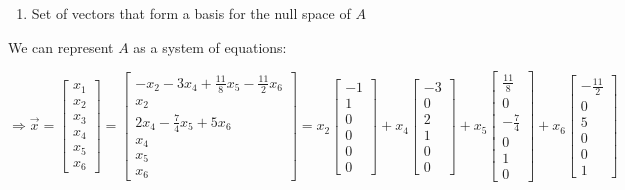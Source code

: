 \documentclass[
  letterpaper,
  DIV=11,
  numbers=noendperiod]{scrartcl}
\providecommand{\tightlist}{%
  \setlength{\itemsep}{0pt}\setlength{\parskip}{0pt}}\usepackage{longtable,booktabs,array}
\begin{document}
\begin{enumerate}
\def\labelenumi{\alph{enumi}.}
\setcounter{enumi}{2}
\tightlist
\item
  Set of vectors that form a basis for the null space of \(A\)
\end{enumerate}

We can represent \(A\) as a system of equations:


\(\Rightarrow \vec{x} = \begin{bmatrix}x_1 \\ x_2 \\ x_3 \\ x_4 \\ x_5 \\ x_6\end{bmatrix}=\begin{bmatrix}-x_2-3x_4+\frac{11}{8}x_5-\frac{11}{2}x_6 \\ x_2 \\ 2x_4-\frac{7}{4}x_5+5x_6 \\ x_4 \\ x_5 \\ x_6\end{bmatrix}=x_2\begin{bmatrix}-1 \\ 1 \\ 0 \\ 0 \\ 0 \\ 0\end{bmatrix}+x_4\begin{bmatrix}-3 \\ 0 \\ 2 \\ 1 \\ 0 \\ 0\end{bmatrix}+x_5\begin{bmatrix}\frac{11}{8}\\ 0 \\ -\frac{7}{4} \\ 0 \\ 1 \\ 0\end{bmatrix}+x_6\begin{bmatrix}-\frac{11}{2} \\ 0 \\ 5 \\ 0 \\ 0 \\ 1\end{bmatrix}\)
\end{document}
